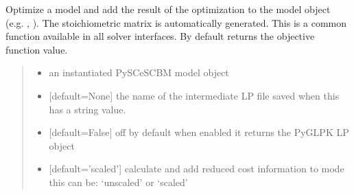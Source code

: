 \documentclass[letterpaper,12pt,english]{sphinxmanual}
\begin{document}
\begin{fulllineitems}
\label{\detokenize{api/solvers:cbmpy.CBGLPK.glpk_analyzeModel}}
\pysigstartsignatures
\pysiglinewithargsret
{}
{\sphinxparamcomma {}\sphinxparamcomma {}\sphinxparamcomma {}\sphinxparamcomma {}\sphinxparamcomma {}\sphinxparamcomma {}\sphinxparamcomma {}\sphinxparamcomma {}\sphinxparamcomma {}}
{}
\pysigstopsignatures
\sphinxAtStartPar
Optimize a model and add the result of the optimization to the model object (e.g. , ). The stoichiometric matrix is automatically generated. This is a common function available in all solver interfaces. By default returns the objective function value.
\begin{quote}\begin{description}
\begin{itemize}
\item {} 
\sphinxAtStartPar
{} \textendash{} an instantiated PySCeSCBM model object

\item {} 
\sphinxAtStartPar
{} \textendash{} {[}default=None{]} the name of the intermediate LP file saved when this has a string value.

\item {} 
\sphinxAtStartPar
{} \textendash{} {[}default=False{]} off by default when enabled it returns the PyGLPK LP object

\item {} 
\sphinxAtStartPar
{} \textendash{} {[}default=’scaled’{]} calculate and add reduced cost information to mode this can be: ‘unscaled’ or ‘scaled’


\end{itemize}
\end{description}
\end{quote}
\end{fulllineitems}
\end{document}
